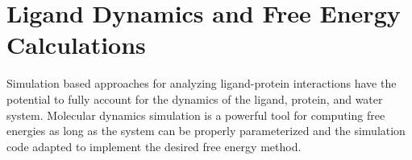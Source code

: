 \section{Ligand Dynamics and Free Energy Calculations}
  
Simulation based approaches for analyzing ligand-protein interactions have the potential to fully account for the dynamics of the ligand, protein, and water system.  Molecular dynamics simulation is a powerful tool for computing free energies as long as the system can be properly parameterized and the simulation code adapted to implement the desired free energy method.

